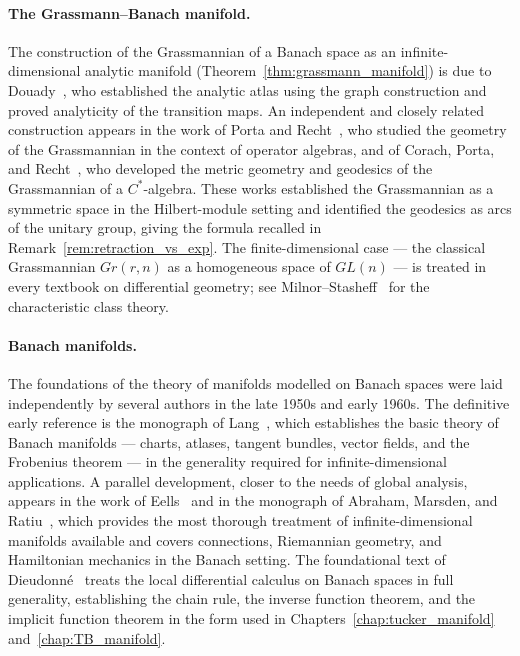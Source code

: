 \paragraph{The Grassmann--Banach manifold.}
The construction of the Grassmannian of a Banach space as an
infinite-dimensional analytic manifold
(Theorem~\ref{thm:grassmann_manifold}) is due to Douady~\cite{Douady1966},
who established the analytic atlas using the graph construction and
proved analyticity of the transition maps. An independent and closely
related construction appears in the work of Porta and
Recht~\cite{PortaRecht1994}, who studied the geometry of the Grassmannian
in the context of operator algebras, and of Corach, Porta, and
Recht~\cite{CorachPortaRecht1993}, who developed the metric geometry and
geodesics of the Grassmannian of a $C^*$-algebra. These works established
the Grassmannian as a symmetric space in the Hilbert-module setting and
identified the geodesics as arcs of the unitary group, giving the formula
recalled in Remark~\ref{rem:retraction_vs_exp}. The finite-dimensional
case — the classical Grassmannian $Gr(r, n)$ as a homogeneous space of
$GL(n)$ — is treated in every textbook on differential geometry;
see Milnor--Stasheff~\cite{MilnorStasheff1974} for the characteristic
class theory.

\paragraph{Banach manifolds.}
The foundations of the theory of manifolds modelled on Banach spaces were
laid independently by several authors in the late 1950s and early 1960s.
The definitive early reference is the monograph of
Lang~\cite{Lang1999}, which establishes the basic theory of Banach
manifolds — charts, atlases, tangent bundles, vector fields, and the
Frobenius theorem — in the generality required for infinite-dimensional
applications. A parallel development, closer to the needs of global
analysis, appears in the work of Eells~\cite{Eells1966} and in the
monograph of Abraham, Marsden, and Ratiu~\cite{AbrahamMarsdenRatiu1988},
which provides the most thorough treatment of infinite-dimensional
manifolds available and covers connections, Riemannian geometry, and
Hamiltonian mechanics in the Banach setting. The foundational text of
Dieudonné~\cite{Dieudonne1972} treats the local differential calculus
on Banach spaces in full generality, establishing the chain rule,
the inverse function theorem, and the implicit function theorem
in the form used in Chapters~\ref{chap:tucker_manifold}
and~\ref{chap:TB_manifold}.

